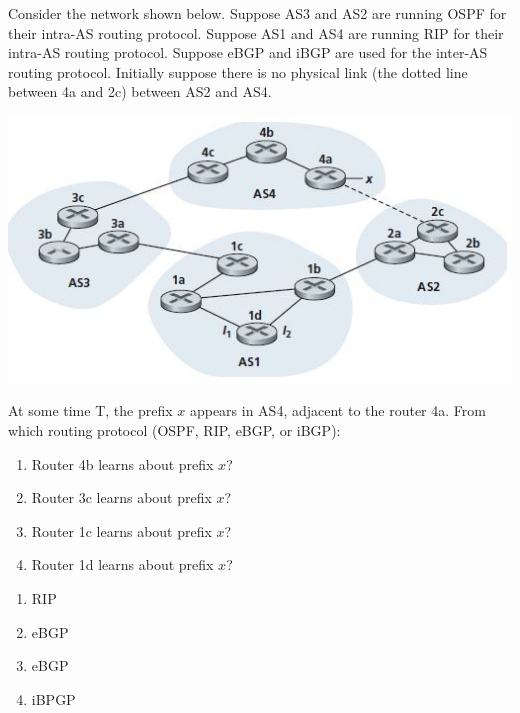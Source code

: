 \documentclass{report}
\begin{document}
\newpage
\begin{problem}
Consider the network shown below.
Suppose AS3 and AS2 are running OSPF for their intra-AS routing protocol.
Suppose AS1 and AS4 are running RIP for their intra-AS routing protocol.
Suppose eBGP and iBGP are used for the inter-AS routing protocol.
Initially suppose there is no physical link (the dotted line between 4a and 2c) between AS2 and AS4.

\begin{center}
\includegraphics[width=.6\columnwidth]{figures/hw7-q4.jpg}
\end{center}

At some time T, the prefix $x$ appears in AS4, adjacent to the router 4a.
From which routing protocol (OSPF, RIP, eBGP, or iBGP):

\begin{enumerate}
\item Router 4b learns about prefix $x$?
\item Router 3c learns about prefix $x$?
\item Router 1c learns about prefix $x$?
\item Router 1d learns about prefix $x$?
\end{enumerate}



\begin{answer}{30em}
    \begin{enumerate}
        \item RIP
        \item eBGP
        \item eBGP
        \item iBPGP
    \end{enumerate}
\end{answer}
\end{problem}
\end{document}
